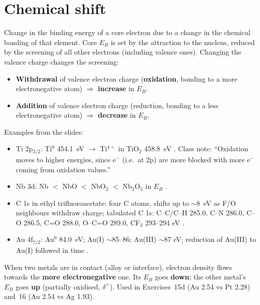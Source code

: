 \section{Chemical shift}
\begin{defbox}
Change in the binding energy of a core electron due to a change in the chemical bonding of that element.
Core $E_B$ is set by the attraction to the nucleus, reduced by the screening of all other electrons (including
valence ones). Changing the valence charge changes the screening:
\begin{itemize}
  \item \textbf{Withdrawal} of valence electron charge (\textbf{oxidation}, bonding to a more electronegative atom)
        $\Rightarrow$ \textbf{increase} in $E_B$.
  \item \textbf{Addition} of valence electron charge (reduction, bonding to a less electronegative atom)
        $\Rightarrow$ \textbf{decrease} in $E_B$.
\end{itemize}
\end{defbox}
Examples from the slides:
\begin{itemize}
  \item Ti 2p$_{3/2}$: Ti$^0$ \SI{454.1}{eV} $\to$ Ti$^{4+}$ in TiO$_2$ \SI{458.8}{eV} .
        Class note: ``Oxidation moves to higher energies, since e$^-$ (i.e.\ at 2p) are more blocked with more e$^-$
        coming from oxidation values.''
  \item Nb 3d: Nb $<$ NbO $<$ NbO$_2$ $<$ Nb$_2$O$_5$ in $E_B$ .
  \item C 1s in ethyl trifluoroacetate: four C atoms, shifts up to $\sim$\SI{8}{eV} as F/O neighbours withdraw charge;
        tabulated C 1s: C--C/C--H 285.0, C--N 286.0, C--O 286.5, C=O 288.0, O--C=O 289.0, CF$_3$ 293--294 eV .
  \item Au 4f$_{7/2}$: Au$^0$ \SI{84.0}{eV}; Au(I) $\sim$85--86; Au(III) $\sim$87 eV; reduction of Au(III) to Au(I) followed in
        time .
\end{itemize}
\begin{tipbox}
When two metals are in contact (alloy or interface), electron density flows towards the \textbf{more electronegative}
one. Its $E_B$ goes \textbf{down}; the other metal's $E_B$ goes \textbf{up} (partially oxidised, $\delta^+$). Used in
Exercises~15d (Au 2.54 vs Pt 2.28) and~16 (Au 2.54 vs Ag 1.93).
\end{tipbox}

